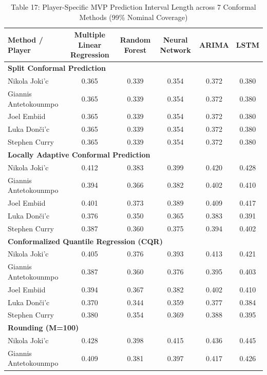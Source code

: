 \documentclass[11pt,a4paper]{article}
\begin{document}
\begin{table}[H]
\centering
\caption{Table 17: Player-Specific MVP Prediction Interval Length across 7 Conformal Methods (99\% Nominal Coverage)}
\label{tab:mvp_star_len_99}
\scriptsize
\begin{tabular}{lccccc}
\toprule
Method / Player & Multiple Linear Regression & Random Forest & Neural Network & ARIMA & LSTM \\
\midrule
\multicolumn{6}{l}{\textbf{Split Conformal Prediction}} \\
\midrule
Nikola Joki'{c} & 0.365 & 0.339 & 0.354 & 0.372 & 0.380 \\
Giannis Antetokounmpo & 0.365 & 0.339 & 0.354 & 0.372 & 0.380 \\
Joel Embiid & 0.365 & 0.339 & 0.354 & 0.372 & 0.380 \\
Luka Don\v{c}i'{c} & 0.365 & 0.339 & 0.354 & 0.372 & 0.380 \\
Stephen Curry & 0.365 & 0.339 & 0.354 & 0.372 & 0.380 \\
\midrule
\multicolumn{6}{l}{\textbf{Locally Adaptive Conformal Prediction}} \\
\midrule
Nikola Joki'{c} & 0.412 & 0.383 & 0.399 & 0.420 & 0.428 \\
Giannis Antetokounmpo & 0.394 & 0.366 & 0.382 & 0.402 & 0.410 \\
Joel Embiid & 0.401 & 0.373 & 0.389 & 0.409 & 0.417 \\
Luka Don\v{c}i'{c} & 0.376 & 0.350 & 0.365 & 0.383 & 0.391 \\
Stephen Curry & 0.387 & 0.360 & 0.375 & 0.394 & 0.402 \\
\midrule
\multicolumn{6}{l}{\textbf{Conformalized Quantile Regression (CQR)}} \\
\midrule
Nikola Joki'{c} & 0.405 & 0.376 & 0.393 & 0.413 & 0.421 \\
Giannis Antetokounmpo & 0.387 & 0.360 & 0.376 & 0.395 & 0.403 \\
Joel Embiid & 0.394 & 0.367 & 0.382 & 0.402 & 0.410 \\
Luka Don\v{c}i'{c} & 0.370 & 0.344 & 0.359 & 0.377 & 0.384 \\
Stephen Curry & 0.380 & 0.354 & 0.369 & 0.388 & 0.395 \\
\midrule
\multicolumn{6}{l}{\textbf{Rounding (M=100)}} \\
\midrule
Nikola Joki'{c} & 0.428 & 0.398 & 0.415 & 0.436 & 0.445 \\
Giannis Antetokounmpo & 0.409 & 0.381 & 0.397 & 0.417 & 0.426 \\

\end{tabular}
\end{table}
\end{document}

